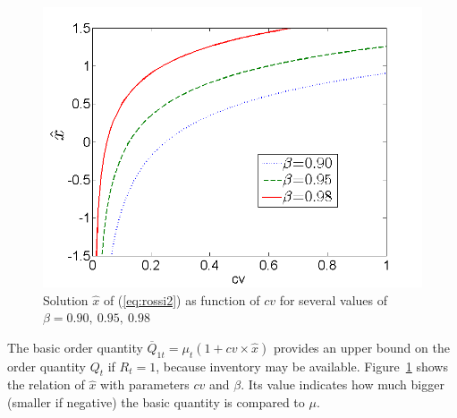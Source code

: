 \begin{figure}[!bt]
\centering
\includegraphics[scale=0.4]{iccsa2015/figures/xhat_ncvnew.png}
\caption{Solution $\hat x$ of (\ref{eq:rossi2}) as function of $cv$ for several values of $\beta=0.90, \ 0.95, \ 0.98$ %
}
\label{fig:xhat_ncv}
\end{figure}
%
The basic order quantity $\overline Q_{1t}= \mu_t(1+cv\times\hat x)$ provides an upper bound on the order quantity $Q_t$ if $R_t=1$, because inventory may be available. Figure~\ref{fig:xhat_ncv} shows the relation of $\hat x$ with parameters $cv$ and $\beta$. Its value indicates how much bigger (smaller if negative) the basic quantity is compared to $\mu$.

